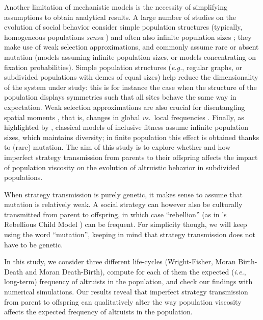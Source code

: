 \documentclass[11pt, letterpaper]{article}
\newcommand{\ie}{\textit{i.e.}}
\newcommand{\eg}{\textit{e.g.}}
\newcommand{\vs}{\textit{vs.\ }}
\begin{document}
Another limitation of mechanistic models is the necessity of simplifying assumptions to obtain analytical results. A large number of studies on the evolution of social behavior consider simple population structures (typically, homogeneous populations \textit{sensu} \citet[][]{TaylorDayWild2007}) and often also infinite population sizes \citep[but see][for results on any structure]{Allen2017}; they make use of weak selection approximations, and commonly assume rare \citep[\eg,][]{LeturqueRousset2002, Taylor2007JTB, TarnitaTaylor2014} or absent mutation (models assuming infinite population sizes, or models concentrating on fixation probabilities). 
Simple population structures (\eg, regular graphs, or subdivided populations with demes of equal sizes) help reduce the dimensionality of the system under study: this is for instance the case when the structure of the population displays symmetries such that all sites behave the same way in expectation. Weak selection approximations are also crucial for disentangling spatial moments \citep{Lion2016}, that is, changes in global \vs local frequencies \citep[though they can in some cases be relaxed][]{MullonLehmann2014}. Finally, as highlighted by \citet{TarnitaTaylor2014}, classical models of inclusive fitness assume infinite population sizes, which maintains diversity; in finite population this effect is obtained thanks to (rare) mutation. The aim of this study is to explore whether and how imperfect strategy transmission from parents to their offspring affects the impact of population viscosity on the evolution of altruistic behavior in subdivided populations. 

When strategy transmission is purely genetic, it makes sense to assume that mutation is relatively weak. A social strategy can however also be culturally transmitted from parent to offspring, in which case ``rebellion'' (as in \citeauthor{Frank1997}'s Rebellious Child Model \citep{Frank1997}) can be frequent. For simplicity though, we will keep using the word ``mutation'', keeping in mind that strategy transmission does not have to be genetic. 

In this study, we consider three different life-cycles (Wright-Fisher, Moran Birth-Death and Moran Death-Birth), compute for each of them the expected (\ie, long-term) frequency of altruists in the population, and check our findings with numerical simulations. Our results reveal that imperfect strategy transmission from parent to offspring can qualitatively alter the way population viscosity affects the expected frequency of altruists in the population. 
\end{document}
